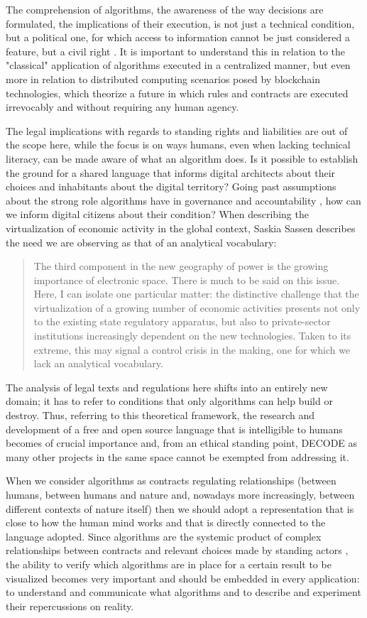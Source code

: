 \documentclass{svproc}
\begin{document}
The comprehension of algorithms, the awareness of the way decisions
are formulated, the implications of their execution, is not just a
technical condition, but a political one, for which access to
information cannot be just considered a feature, but a civil right
\cite{pelizza2017a}. It is important to understand this in
relation to the "classical" application of algorithms executed in a
centralized manner, but even more in relation to distributed computing
scenarios posed by blockchain technologies, which theorize a future in
which rules and contracts are executed irrevocably and without
requiring any human agency.

The legal implications with regards to standing rights and liabilities
are out of the scope here, while the focus is on ways humans, even
when lacking technical literacy, can be made aware of what an
algorithm does. Is it possible to establish the ground for a shared
language that informs digital architects about their choices and
inhabitants about the digital territory? Going past assumptions about
the strong role algorithms have in governance and accountability
\cite{diakopoulos2016a}, how can we inform digital citizens about
their condition?  When describing the virtualization of economic
activity in the global context, Saskia Sassen describes the need we
are observing as that of an analytical vocabulary:

\blockquote{The third component in the new geography of power is the
  growing importance of electronic space. There is much to be said on
  this issue. Here, I can isolate one particular matter: the
  distinctive challenge that the virtualization of a growing number of
  economic activities presents not only to the existing state
  regulatory apparatus, but also to private-sector institutions
  increasingly dependent on the new technologies. Taken to its
  extreme, this may signal a control crisis in the making, one for
  which we lack an analytical vocabulary. \cite{sassen1996a} }

The analysis of legal texts and regulations here shifts into an
entirely new domain; it has to refer to conditions that only
algorithms can help build or destroy. Thus, referring to this
theoretical framework, the research and development of a free and open
source language that is intelligible to humans becomes of crucial
importance and, from an ethical standing point, DECODE as many other
projects in the same space cannot be exempted from addressing it.

When we consider algorithms as contracts regulating relationships
(between humans, between humans and nature and, nowadays more
increasingly, between different contexts of nature itself) then we
should adopt a representation that is close to how the human mind
works and that is directly connected to the language adopted. Since
algorithms are the systemic product of complex relationships between
contracts and relevant choices made by standing actors
\cite{monico2014}, the ability to verify which algorithms are in place
for a certain result to be visualized becomes very important and
should be embedded in every application: to understand and communicate
what algorithms and to describe and experiment their repercussions on
reality.
\end{document}
